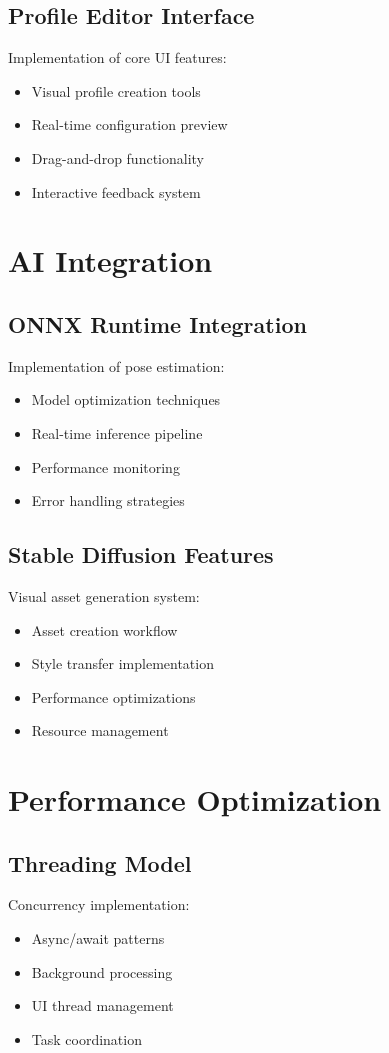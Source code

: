 \subsection{Profile Editor Interface}
Implementation of core UI features:
\begin{itemize}
    \item Visual profile creation tools
    \item Real-time configuration preview
    \item Drag-and-drop functionality
    \item Interactive feedback system
\end{itemize}

\section{AI Integration}
\subsection{ONNX Runtime Integration}
Implementation of pose estimation:
\begin{itemize}
    \item Model optimization techniques
    \item Real-time inference pipeline
    \item Performance monitoring
    \item Error handling strategies
\end{itemize}

\subsection{Stable Diffusion Features}
Visual asset generation system:
\begin{itemize}
    \item Asset creation workflow
    \item Style transfer implementation
    \item Performance optimizations
    \item Resource management
\end{itemize}

\section{Performance Optimization}
\subsection{Threading Model}
Concurrency implementation:
\begin{itemize}
    \item Async/await patterns
    \item Background processing
    \item UI thread management
    \item Task coordination
\end{itemize}

